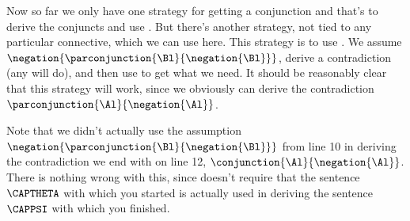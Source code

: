 Now so far we only have one strategy for getting a conjunction and that's to derive the conjuncts and use . 
But there's another strategy, not tied to any particular connective, which we can use here. 
This strategy is to use . 
We assume $\negation{\parconjunction{\Bl}{\negation{\Bl}}}$, derive a contradiction (any will do), and then use  to get what we need. 
It should be reasonably clear that this strategy will work, since we obviously can derive the contradiction $\parconjunction{\Al}{\negation{\Al}}$.
\begin{gproof}[\label{bycontradiction}]
\end{gproof}
Note that we didn't actually use the assumption $\negation{\parconjunction{\Bl}{\negation{\Bl}}}$ from line 10 in deriving the contradiction we end with on line 12, $\conjunction{\Al}{\negation{\Al}}$. There is nothing wrong with this, since  doesn't require that the sentence $\CAPTHETA$ with which you started is actually used in deriving the sentence $\CAPPSI$ with which you finished. 

